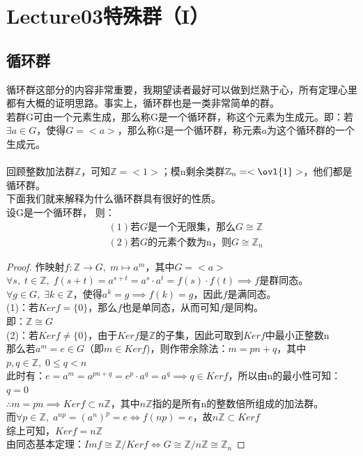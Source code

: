 \chapter*{Lecture03特殊群（I）}

\section{循环群}
循环群这部分的内容非常重要，我期望读者最好可以做到烂熟于心，所有定理心里都有大概的证明思路。事实上，循环群也是一类非常简单的群。\\
若群G可由一个元素生成，那么称G是一个循环群，称这个元素为生成元。即：若$\exists a\in G$，使得$G=<a>$，那么称G是一个循环群，称元素$a$为这个循环群的一个生成元。\\
\\
回顾整数加法群$\mathbb{Z}$，可知$\mathbb{Z}=<1>$；模n剩余类群$\mathbb{Z}_n=<\ovl{1}>$，他们都是循环群。\\
下面我们就来解释为什么循环群具有很好的性质。\\
设G是一个循环群， 则：
\[
\begin{aligned}
&(1)\text{若}G\text{是一个无限集，那么}G\cong \mathbb{Z}\\
&(2)\text{若}G\text{的元素个数为n，则}G\cong \mathbb{Z}_n
\end{aligned}
\]
\begin{proof}
作映射$f\colon \mathbb{Z}\to G,\; m\mapsto a^m$，其中$G=<a>$\\
$\forall s,\; t\in \mathbb{Z},\; f(s+t)=a^{s+t}=a^s\cdot a^t=f(s)\cdot f(t)\implies f$是群同态。\\
$\forall g\in G,\; \exists k\in \mathbb{Z}$，使得$a^k=g\implies f(k)=g$，因此$f$是满同态。\\
(1)：若$Kerf=\{0\}$，那么$f$也是单同态，从而可知$f$是同构。\\
即：$\mathbb{Z}\cong G$\\
(2)：若$Kerf\neq \{0\}$，由于$Kerf$是$\mathbb{Z}$的子集，因此可取到$Kerf$中最小正整数n\\
那么若$a^m=e\in G$（即$m\in Kerf$)，则作带余除法：$m=pn+q$，其中$p,q\in \mathbb{Z},\; 0\leq q <n$\\
此时有：$e=a^m=a^{pn+q}=e^p\cdot a^q=a^q\implies q\in Kerf$，所以由n的最小性可知：$q=0$\\
$\therefore m=pn\implies Kerf\subset n\mathbb{Z}$，其中$n\mathbb{Z}$指的是所有n的整数倍所组成的加法群。\\
而$\forall p\in \mathbb{Z},\; a^{np}=(a^n)^p=e\iff f(np)=e$，故$n\mathbb{Z}\subset Kerf$\\
综上可知，$Kerf=n\mathbb{Z}$\\
由同态基本定理：$Imf\cong \mathbb{Z}/Kerf \iff G\cong \mathbb{Z}/n\mathbb{Z}\cong \mathbb{Z}_n$
\end{proof}
